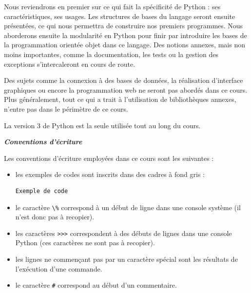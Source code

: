 \documentclass[12pt, a4paper]{article}
\begin{document}
Nous reviendrons en premier sur ce qui fait la spécificité de Python : ses caractéristiques, ses usages. Les structures de bases du langage seront ensuite présentées, ce qui nous permettra de construire nos premiers  programmes. Nous aborderons ensuite la modularité en Python pour finir par introduire les bases de la programmation orientée objet dans ce langage. Des notions annexes, mais non moins importantes, comme la documentation, les tests ou la gestion des exceptions s’intercaleront en cours de route.

Des sujets comme la connexion à des bases de données, la réalisation d'interface graphiques ou encore la programmation web ne seront pas abordés dans ce cours. Plus généralement, tout ce qui a trait à l'utilisation de bibliothèques annexes, n'entre pas dans le périmètre de ce cours.

La version 3 de Python est la seule utilisée tout au long du cours.
 
\vspace{2cm}


\begin{footnotesize}
	\begin{minipage}{0.9\textwidth}
		\textbf{\textit{Conventions d'écriture}}
		
		Les conventions d'écriture employées dans ce cours sont les suivantes :
		
		\begin{itemize}
			\item les exemples de codes sont inscrits dans des cadres à fond gris : 
				\begin{lstlisting}
Exemple de code
				\end{lstlisting}

			\item le caractère \lstinline{\%} correspond à un début de ligne dans une console système (il n'est donc pas à recopier).
			\item les caractères \lstinline{>>>} correspondent à des débuts de lignes dans une console Python (ces caractères ne sont pas à recopier).
			\item les lignes ne commençant pas par un caractère spécial sont les résultats de l'exécution d'une commande.
			\item le caractère \lstinline{#} correspond au début d'un commentaire.
		\end{itemize}
	\end{minipage}
\end{footnotesize}
\end{document}

